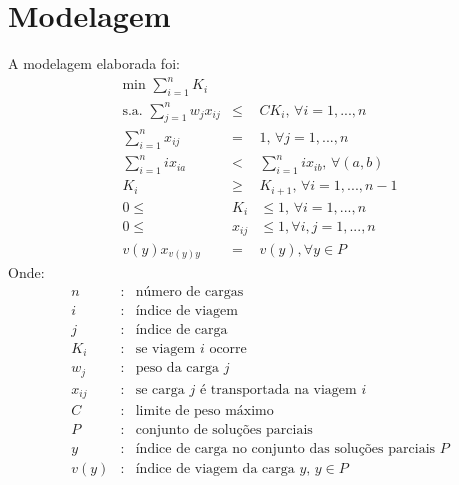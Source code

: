 \documentclass{article}
\begin{document}
\section{Modelagem} \label{modelagem}
A modelagem elaborada foi:
\begin{eqnarray}
    \mbox{min } \sum_{i=1}^n K_i\\
    \mbox{s.a. }\sum_{j=1}^n w_j x_{ij} &\leq& C K_i \mbox{, } \forall i = 1, ..., n\\
    \sum_{i=1}^n x_{ij} &=& 1 \mbox{, } \forall j = 1, ..., n\\
    \sum_{i=1}^n i x_{ia} &<& \sum_{i=1}^n ix_{ib} \mbox{, } \forall (a, b)\\
    K_i &\geq& K_{i+1} \mbox{, } \forall i = 1, ..., n-1\\
    0 \leq &K_i& \leq 1 \mbox{, } \forall i = 1, ..., n\\
    0 \leq &x_{ij}& \leq 1, \forall i, j = 1, ..., n\\
    v(y)x_{v(y)y} &=& v(y), \forall y \in P
\end{eqnarray}
Onde:
\begin{eqnarray*}
    n &:& \mbox{número de cargas}\\
    i &:& \mbox{índice de viagem}\\
    j &:& \mbox{índice de carga}\\
    K_i &:& \mbox{se viagem } i \mbox{ ocorre}\\
    w_j &:& \mbox{peso da carga } j\\
    x_{ij} &:& \mbox{se carga } j \mbox{ é transportada na viagem } i\\
    C &:& \mbox{limite de peso máximo}\\
    P &:& \mbox{conjunto de soluções parciais}\\
    y &:& \mbox{índice de carga no conjunto das soluções parciais }P\\
    v(y) &:& \mbox{índice de viagem da carga }y \mbox{, } y \in P
\end{eqnarray*}

\newpage
\end{document}
